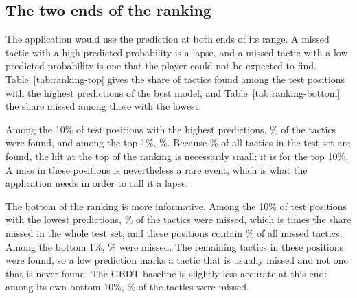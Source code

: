 \documentclass[11pt]{article}
\begin{document}
\iflook
\subsection{The two ends of the ranking}

The application would use the prediction at both ends of its range. A missed
tactic with a high predicted probability is a lapse, and a missed tactic with
a low predicted probability is one that the player could not be expected to
find. Table~\ref{tab:ranking-top} gives the share of tactics found among the
test positions with the highest predictions of the best model, and
Table~\ref{tab:ranking-bottom} the share missed among those with the lowest.

Among the 10\% of test positions with the highest predictions,
\% of the tactics were found, and among the top 1\%,
\%. Because \% of all tactics in the
test set are found, the lift at the top of the ranking is necessarily small:
it is  for the top 10\%. A miss in these
positions is nevertheless a rare event, which is what the application needs
in order to call it a lapse.

\begin{table}[htbp]\centering\small
{}
\caption{The top of the ranking. For a share of the test positions taken from
the highest predicted probabilities: \emph{precision} is the share of these
positions in which the tactic was found, \emph{recall} is the share of all
found tactics that they contain, and \emph{lift} is the precision divided by
the share found in the whole test set.}
\label{tab:ranking-top}
\end{table}

\begin{table}[htbp]\centering\small
{}
\caption{The bottom of the ranking. For a share of the test positions taken
from the lowest predicted probabilities: \emph{precision} is the share of
these positions in which the tactic was missed, \emph{recall} is the share of
all missed tactics that they contain, and \emph{lift} is the precision
divided by the share missed in the whole test set.}
\label{tab:ranking-bottom}
\end{table}

The bottom of the ranking is more informative. Among the 10\% of test
positions with the lowest predictions, \% of the
tactics were missed, which is  times the share missed
in the whole test set, and these positions contain
\% of all missed tactics. Among the bottom 1\%,
\% were missed. The remaining tactics in these
positions were found, so a low prediction marks a tactic that is usually
missed and not one that is never found. The GBDT baseline is slightly less
accurate at this end: among its own bottom 10\%,
\% of the tactics were missed.
\fi
\end{document}
